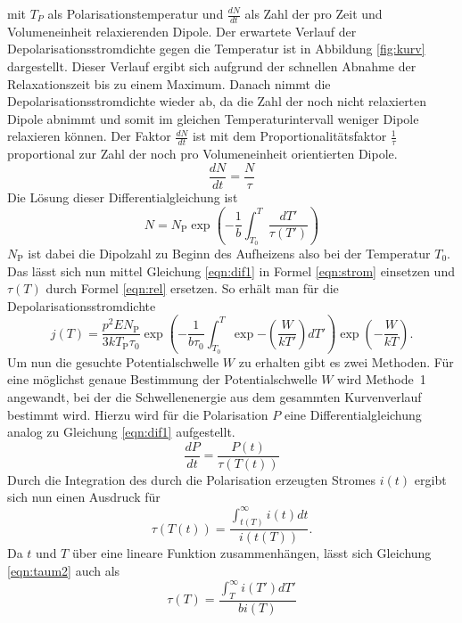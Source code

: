  mit $T_{P}$ als Polarisationstemperatur und $\frac{dN}{dt}$ als Zahl der pro Zeit und Volumeneinheit relaxierenden Dipole.
 Der erwartete Verlauf der Depolarisationsstromdichte gegen die Temperatur ist in Abbildung \ref{fig:kurv} dargestellt.
Dieser Verlauf ergibt sich aufgrund der schnellen Abnahme der Relaxationszeit bis zu einem Maximum.
Danach nimmt die Depolarisationsstromdichte wieder ab, da die Zahl der noch nicht relaxierten Dipole abnimmt und somit im gleichen Temperaturintervall weniger Dipole relaxieren können.
Der Faktor $\frac{dN}{dt}$ ist mit dem Proportionalitätsfaktor $\frac{1}{\tau}$ proportional zur Zahl
der noch pro Volumeneinheit orientierten Dipole.
\begin{equation}
\frac{dN}{dt}=\frac{N}{\tau}
\label{eqn:dif1}
\end{equation}
Die Lösung dieser Differentialgleichung ist
\begin{equation}
N=N_{\text{P}}\exp{\left(-\frac{1}{b}\int_{T_{0}}^{T} \frac{dT'}{\tau(T')}\right)}
\label{eqn:N}
\end{equation}
$N_{\text{P}}$ ist dabei die Dipolzahl zu Beginn des Aufheizens also bei der Temperatur $T_{0}$.
Das lässt sich nun mittel Gleichung \ref{eqn:dif1} in Formel \ref{eqn:strom} einsetzen und $\tau(T)$ durch Formel \ref{eqn:rel} ersetzen.
So erhält man für die Depolarisationsstromdichte
\begin{equation}
j(T)=\frac{p^{2}EN_{\text{P}}}{3kT_{\text{P}}\tau_{0}} \exp{\left(-\frac{1}{b\tau_{0}}\int_{T_{0}}^{T}\exp{-\left(\frac{W}{kT'}\right)dT'}\right)}\exp{\left(-\frac{W}{kT}\right)}  .
\label{strom02}
\end{equation}
Um nun die gesuchte Potentialschwelle $W$ zu erhalten gibt es zwei Methoden.
Für eine möglichst genaue Bestimmung der Potentialschwelle $W$ wird Methode~1 angewandt, bei der
die Schwellenenergie aus dem gesammten Kurvenverlauf bestimmt wird.
Hierzu wird für die Polarisation $P$ eine Differentialgleichung analog
zu Gleichung \ref{eqn:dif1} aufgestellt.
\begin{equation}
  \frac{dP}{dt}=\frac{P(t)}{\tau(T(t))}
\end{equation}
Durch die Integration des durch die Polarisation erzeugten Stromes $i(t)$
ergibt sich nun einen Ausdruck für
\begin{equation}
  \tau(T(t))=\frac{\int_{t(T)}^{\infty} i(t) dt}{i(t(T))} .
  \label{eqn:taum2}
\end{equation}
Da $t$ und $T$ über eine lineare Funktion zusammenhängen, lässt sich Gleichung \ref{eqn:taum2} auch als
\begin{equation}
  \tau(T)=\frac{\int_{T}^{\infty}i(T')dT'}{bi(T)}
\end{equation}
